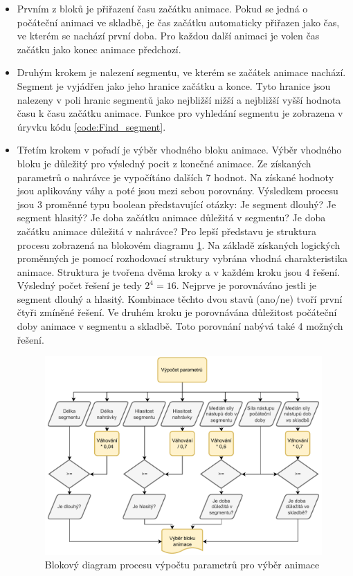 \begin{itemize}
    \item  
    Prvním z bloků je přiřazení času začátku animace. Pokud se jedná o počáteční animaci ve skladbě, je čas začátku automaticky přiřazen jako čas, ve kterém se nachází první doba. Pro každou další animaci je volen čas začátku jako konec animace předchozí.
    \item 
    Druhým krokem je nalezení segmentu, ve kterém se začátek animace nachází. Segment je vyjádřen jako jeho hranice začátku a konce. Tyto hranice jsou nalezeny v poli hranic segmentů jako nejbližší nižší a nejbližší vyšší hodnota času k času začátku animace. Funkce pro vyhledání segmentu je zobrazena v úryvku kódu \ref{code:Find_segment}. 

    \item 
    Třetím krokem v pořadí je výběr vhodného bloku animace. Výběr vhodného bloku je důležitý pro výsledný pocit z konečné animace. Ze získaných parametrů o nahrávce je vypočítáno dalších 7 hodnot. Na získané hodnoty jsou aplikovány váhy a poté jsou mezi sebou porovnány. Výsledkem procesu jsou 3 proměnné typu boolean představující otázky: Je segment dlouhý? Je segment hlasitý? Je doba začátku animace důležitá v segmentu? Je doba začátku animace důležitá v nahrávce? Pro lepší představu je struktura procesu zobrazená na blokovém diagramu \ref{fig:Anim_block_param_selection_diagram}. Na základě získaných logických proměnných je pomocí rozhodovací struktury vybrána vhodná charakteristika animace. Struktura je tvořena dvěma kroky a v každém kroku jsou 4 řešení. Výsledný počet řešení je tedy $2^4 = 16$. Nejprve je porovnáváno jestli je segment dlouhý a hlasitý. Kombinace těchto dvou stavů (ano/ne) tvoří první čtyři zmíněné řešení. Ve druhém kroku je porovnávána důležitost počáteční doby animace v segmentu a skladbě. Toto porovnání nabývá také 4 možných řešení.  

    \begin{figure}[H]
        \centering
        \includegraphics[width = 1\linewidth]{obrazky/UML_diagramy_anim_bock_selection _part_1.pdf}
        \caption{Blokový diagram procesu výpočtu parametrů pro výběr animace}
        \label{fig:Anim_block_param_selection_diagram}
    \end{figure}


\end{itemize}
